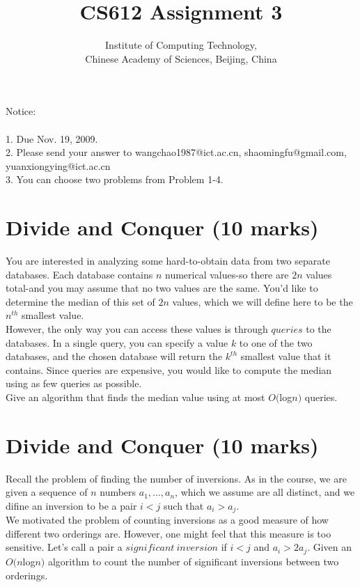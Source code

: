 \documentclass[a4paper,11pt]{article}
\title{CS612 Assignment 3}
\author{Institute of Computing Technology, \\
                       Chinese Academy of Sciences, Beijing, China }
\begin{document}
\maketitle

Notice:\\\\
1. Due Nov. 19, 2009.\\
2. Please send your answer to wangchao1987@ict.ac.cn, shaomingfu@gmail.com, yuanxiongying@ict.ac.cn\\
3. You can choose two problems from Problem 1-4.
\section{Divide and Conquer (10 marks)}

You are interested in analyzing some hard-to-obtain data from two separate databases. Each database contains $n$ numerical values-so there are $2n$ values total-and you may assume that no two values are the same. You'd like to determine the median of this set of $2n$ values, which we will define here to be the $n^{th}$ smallest value.\\

However, the only way you can access these values is through $queries$ to the databases. In a single query, you can specify a value $k$ to one of the two databases, and the chosen database will return the $k^{th}$ smallest value that it contains. Since queries are expensive, you would like to compute the median using as few queries as possible.\\

Give an algorithm that finds the median value using at most $O($log$n)$ queries.

\section{Divide and Conquer (10 marks)}

Recall the problem of finding the number of inversions. As in the course, we are given a sequence of $n$ numbers $a_1,...,a_n$, which we assume are all distinct, and we difine an inversion to be a pair $i<j$ such that $a_i>a_j$.\\

We motivated the problem of counting inversions as a good measure of how different two orderings are. However, one might feel that this measure is too sensitive. Let's call a pair a $significant\ inversion$ if $i<j$ and $a_i>2a_j$. Given an $O(n$log$n)$ algorithm to count the number of significant inversions between two orderings.
\end{document}
